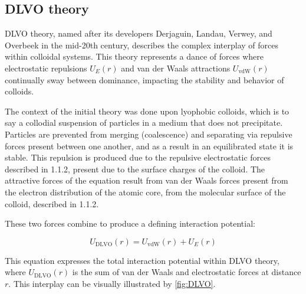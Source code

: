 
\subsection{DLVO theory}



DLVO theory, named after its developers Derjaguin, Landau, Verwey, and Overbeek in the mid-20th century, describes the complex interplay of forces within colloidal systems. This theory represents a dance of forces where electrostatic repulsions \( U_E(r) \) and van der Waals attractions \( U_{\text{vdW}}(r) \) continually sway between dominance, impacting the stability and behavior of colloids.\cite{DLVOorign} \cite{Origin2V} \cite{DERJAGUINORIGIN}


The context of the initial theory was done upon lyophobic colloids, which is to say a collodial suspension of particles in a medium that does not precipitate. Particles are prevented from merging (coalescence) and separating via repulsive forces present between one another, and as a result in an equilibrated state it is stable. This repulsion is produced due to the repulsive electrostatic forces described in 1.1.2, present due to the surface charges of the colloid. The attractive forces of the equation result from van der Waals forces present from the electron distribution of the atomic core, from the molecular surface of the colloid, described in 1.1.2.\cite{DLVOthesis}

These two forces combine to produce a defining interaction potential:

\begin{equation}
U_{\text{DLVO}}(r) = U_{\text{vdW}}(r) + U_{E}(r)
\end{equation}

This equation expresses the total interaction potential within DLVO theory, where \( U_{\text{DLVO}}(r) \) is the sum of van der Waals and electrostatic forces at distance \( r \). This interplay can be visually illustrated by \ref{fig:DLVO}.


